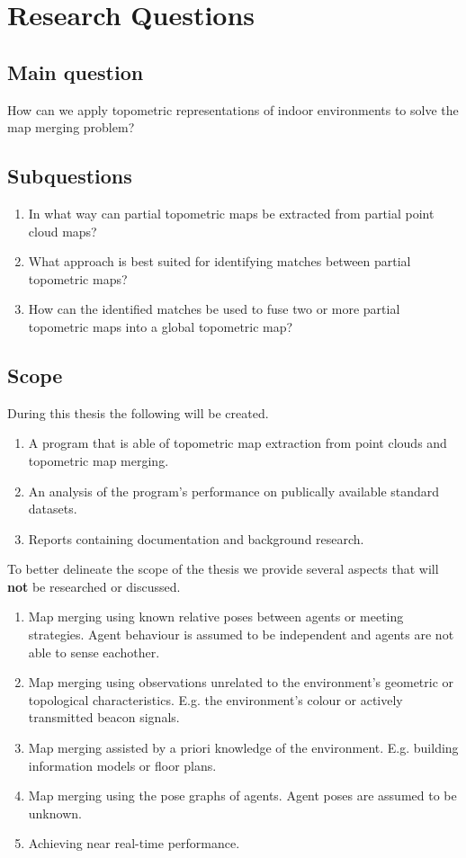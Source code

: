 \section{Research Questions}

\subsection{Main question}
How can we apply topometric representations of indoor environments to solve the map merging problem?

\subsection{Subquestions}
\begin{enumerate}
    \item In what way can partial topometric maps be extracted from partial point cloud maps?
    \item What approach is best suited for identifying matches between partial topometric maps?
    \item How can the identified matches be used to fuse two or more partial topometric maps into a global topometric map?
\end{enumerate}

\subsection{Scope}

During this thesis the following will be created.

\begin{enumerate}
    \item A program that is able of topometric map extraction from point clouds and topometric map merging.
    \item An analysis of the program's performance on publically available standard datasets.
    \item Reports containing documentation and background research.
\end{enumerate}

To better delineate the scope of the thesis we provide several aspects that will \textbf{not} be researched or discussed. 

\begin{enumerate}
    \item Map merging using known relative poses between agents or meeting strategies. Agent behaviour is assumed to be independent and agents are not able to sense eachother.
    \item Map merging using observations unrelated to the environment's geometric or topological characteristics. E.g. the environment's colour or actively transmitted beacon signals.
    \item Map merging assisted by a priori knowledge of the environment. E.g. building information models or floor plans.
    \item Map merging using the pose graphs of agents. Agent poses are assumed to be unknown.
    \item Achieving near real-time performance.
\end{enumerate}